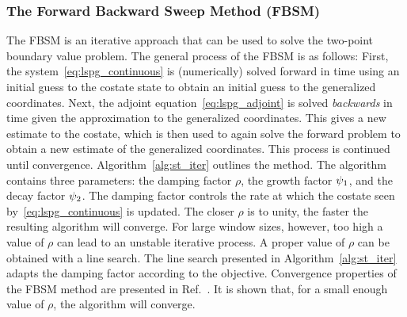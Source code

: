 \subsubsection{The Forward Backward Sweep Method (FBSM)}\label{sec:FBSM}


The FBSM is an iterative approach that can be used to
solve the two-point boundary value problem. The general process of the FBSM is
as follows: First, the system~\eqref{eq:lspg_continuous} is (numerically) solved forward in
time using an initial guess to the costate state to obtain an initial guess to
the generalized coordinates. Next, the adjoint equation~\eqref{eq:lspg_adjoint} is solved \textit{backwards} in time given the
approximation to the generalized coordinates. This gives a new estimate to the
costate, which is then used to again solve the forward problem to obtain
a new estimate of the generalized coordinates. This process is continued until
convergence. Algorithm~\ref{alg:st_iter} outlines the method. The algorithm
contains three parameters: the damping factor $\rho$, the growth factor
$\psi_1$, and the decay factor $\psi_2$. The damping factor controls the rate at which the costate seen by~\eqref{eq:lspg_continuous} is updated. The
closer $\rho$ is to unity, the faster the resulting algorithm will converge.
For large window sizes, however, too high a value of $\rho$ can lead to an unstable iterative process. 
A proper value of $\rho$ can be
obtained with a line search. The line search presented in Algorithm~\ref{alg:st_iter} adapts the damping factor
according to the objective. Convergence properties of the FBSM method are
presented in Ref.~\cite{McAsey2012ConvergenceOT}. It is shown that, for a small 
enough value of $\rho$, the algorithm will converge.

